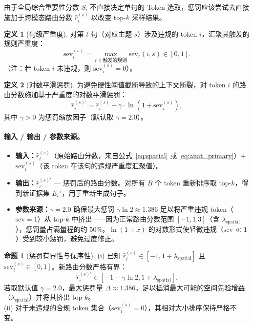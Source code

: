 \documentclass[11pt,a4paper]{article}
\theoremstyle{definition}
\newtheorem{definition}{定义}[section]
\newtheorem{proposition}{命题}[section]
\begin{document}
由于全局综合重要性分数 $S_i$ 不直接决定单句的 Token 选取，惩罚应该尝试去直接施加于跨模态路由分数 $\hat{r}_i^{(s)}$ 以改变 top-$k$ 采样结果。

\begin{definition}[句级严重度]
对第 $t$ 句（对应主题 $s$）涉及违规的 token $i$，汇聚其触发的规则严重度：
\begin{equation}
\mathrm{sev}_i^{(s)} = \max_{r \in \text{触发的规则}} \mathrm{sev}_r(i, s) \in [0,1].
\end{equation}
（注：若 token $i$ 未违规，则 $\mathrm{sev}_i^{(s)} = 0$）。
\end{definition}

\begin{definition}[对数平滑惩罚]
为避免硬性阈值截断导致的上下文断裂，对 token $i$ 的路由分数施加基于严重度的对数平滑惩罚：
\begin{equation}\label{eq:penalty}
\hat{r}_i^{(s)\prime} = \hat{r}_i^{(s)} - \gamma \cdot \ln(1 + \mathrm{sev}_i^{(s)}),
\end{equation}
其中 $\gamma > 0$ 为惩罚缩放因子（默认取 $\gamma = 2.0$）。

\paragraph{输入 / 输出 / 参数来源。}
\begin{itemize}[nosep]
    \item \textbf{输入：}$\hat{r}_i^{(s)}$（原始路由分数，来自公式~\ref{eq:spatial} 或 \ref{eq:anat_primary}）+ $\mathrm{sev}_i^{(s)}$（该 token 在该句的违规严重度汇聚值）。
    \item \textbf{输出：}$\hat{r}_i^{(s)\prime}$ — 惩罚后的路由分数。对所有 $B$ 个 token 重新排序取 top-$k$，得到新证据集 $E_s'$，用于重新生成句子。
    \item \textbf{参数来源：}$\gamma = 2.0$ 确保最大惩罚 $\gamma \ln 2 \approx 1.386$ 足以将严重违规 token（$\mathrm{sev}=1$）从 top-$k$ 中挤出——因为正常路由分数范围 $[-1, 1.3]$（含 $\lambda_{\mathrm{spatial}}$），惩罚量占满量程的约 $50\%$。$\ln(1+x)$ 的对数形式使轻微违规（$\mathrm{sev} \ll 1$）受到较小惩罚，避免过度修正。
\end{itemize}
\end{definition}

\begin{proposition}[惩罚有界性与保序性]
(i) 已知 $\hat{r}_i^{(s)} \in [-1, 1+\lambda_{\text{spatial}}]$ 且 $\mathrm{sev}_i^{(s)} \in [0,1]$。新路由分数严格有界：
\begin{equation}
\hat{r}_i^{(s)\prime} \in [-1 - \gamma \ln 2, 1+\lambda_{\text{spatial}}].
\end{equation}
若取默认值 $\gamma=2.0$，最大惩罚量 $\Delta \approx 1.386$，足以抵消最大可能的空间先验增益（$\lambda_{\text{spatial}}$）并将其挤出 top-$k$。\\
(ii) 对于未违规的合规 token 集合（$\mathrm{sev}_i^{(s)} = 0$），其相对大小排序保持严格不变。
\end{proposition}
\end{document}
